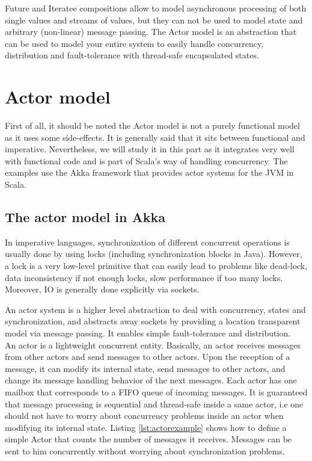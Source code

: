 Future and Iteratee compositions allow to model asynchronous processing of both single values and streams of values, but 
they can not be used to model state and arbitrary (non-linear) message passing.
The Actor model is an abstraction that can be used to model your entire system to easily handle concurrency, distribution and fault-tolerance with thread-safe encapsulated states.

\section{Actor model}

First of all, it should be noted the Actor model is not a purely functional model as it uses some side-effects. It is generally said that it sits between functional and
imperative. Nevertheless, we will study it in this part as it integrates very well with functional code and is part of Scala's way of handling concurrency.
The examples use the Akka framework  that provides actor systems for the JVM in Scala.
\\

\subsection{The actor model in Akka}

In imperative languages, synchronization of different concurrent operations is usually done by using locks (including synchronization blocks in Java). 
However, a lock is a very low-level primitive that can easily lead to problems like dead-lock, data inconsistency if not enough locks, 
slow performance if too many locks. Moreover, IO is generally done explicitly via sockets.

An actor system is a higher level abstraction to deal with concurrency, states and synchronization, and abstracts away sockets by providing a location transparent model
via message passing. It enables simple fault-tolerance and distribution.
\\

An actor is a lightweight concurrent entity. Basically, an actor receives messages from other actors and send messages to other actors. Upon the reception of 
a message, it can modify its internal state, send messages to other actors, and change its message handling behavior of the next messages.
Each actor has one mailbox that corresponds to a FIFO queue of incoming messages.
It is guaranteed that message processing is sequential and thread-safe inside a same actor, i.e one should not have to worry about concurrency problems inside an actor when modifying its internal state. Listing
\ref{lst:actorexample} shows how to define a simple Actor that counts the number of messages it receives. Messages can be sent to him concurrently without worrying
about synchronization problems.

